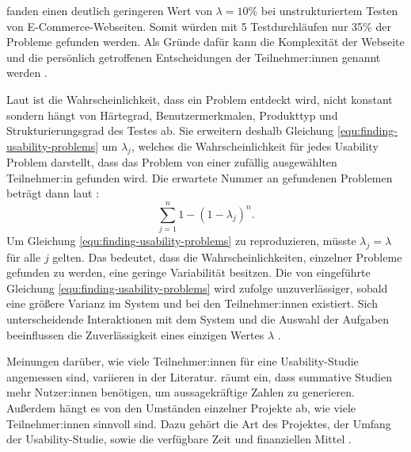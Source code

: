 \textcite{spoolTestingWeb2001} fanden einen deutlich geringeren Wert von $\lambda{}=10\%$ bei unstrukturiertem Testen von E-Commerce-Webseiten. Somit würden mit 5 Testdurchläufen nur 35\% der Probleme gefunden werden. Als Gründe dafür kann die Komplexität der Webseite und die persönlich getroffenen Entscheidungen der Teilnehmer:innen genannt werden \parencite{spoolTestingWeb2001}.

Laut \textcite{woolrychWhyWhen2001} ist die Wahrscheinlichkeit, dass ein Problem entdeckt wird, nicht konstant sondern hängt von Härtegrad, Benutzermerkmalen, Produkttyp und Strukturierungsgrad des Testes ab. Sie erweitern deshalb Gleichung \ref{equ:finding-usability-problems} um $\lambda{}_j$, welches die Wahrscheinlichkeit für jedes Usability Problem darstellt, dass das Problem von einer zufällig ausgewählten Teilnehmer:in gefunden wird. Die erwartete Nummer an gefundenen Problemen beträgt dann laut \textcite{woolrychWhyWhen2001}:
\begin{equation}
  \sum_{j=1}^n 1-(1-\lambda{}_j)^n\text{.}
\end{equation}
Um Gleichung \ref{equ:finding-usability-problems} zu reproduzieren, müsste $\lambda{}_j = \lambda{}$ für alle $j$ gelten. Das bedeutet, dass die Wahrscheinlichkeiten, einzelner Probleme gefunden zu werden, eine geringe Variabilität besitzen. Die von \textcite{nielsenMathematicalModel1993} eingeführte Gleichung \ref{equ:finding-usability-problems} wird \textcite{woolrychWhyWhen2001} zufolge unzuverlässiger, sobald eine größere Varianz im System und bei den Teilnehmer:innen existiert. Sich unterscheidende Interaktionen mit dem System und die Auswahl der Aufgaben beeinflussen die Zuverlässigkeit eines einzigen Wertes $\lambda{}$ \parencite{woolrychWhyWhen2001}.

\pskip
Meinungen darüber, wie viele Teilnehmer:innen für eine Usability-Studie angemessen sind, variieren in der Literatur. \textcite{nielsenHowMany2012} räumt ein, dass summative Studien mehr Nutzer:innen benötigen, um aussagekräftige Zahlen zu generieren. Außerdem hängt es von den Umständen einzelner Projekte ab, wie viele Teilnehmer:innen sinnvoll sind. Dazu gehört die Art des Projektes, der Umfang der Usability-Studie, sowie die verfügbare Zeit und finanziellen Mittel \parencite{nielsenHowMany2012}.
